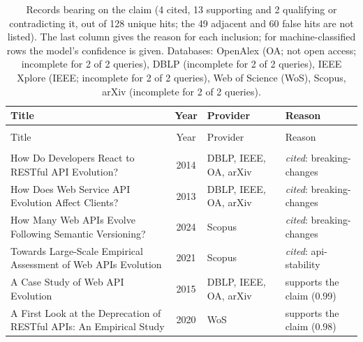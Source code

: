
\begingroup\footnotesize
\begin{longtable}{@{}%
  >{\raggedright\arraybackslash}p{}c%
  >{\raggedright\arraybackslash}p{}%
  >{\raggedright\arraybackslash}p{}@{}}
\caption{Records bearing on the claim (4 cited, 13 supporting and 2 qualifying or contradicting it, out of 128 unique hits; the 49 adjacent and 60 false hits are not listed). The last column gives the reason for each inclusion; for machine-classified rows the model's confidence is given. Databases: OpenAlex (OA; not open access; incomplete for 2 of 2 queries), DBLP (incomplete for 2 of 2 queries), IEEE Xplore (IEEE; incomplete for 2 of 2 queries), Web of Science (WoS), Scopus, arXiv (incomplete for 2 of 2 queries).}\label{tab:t-api-evolution}\\
\toprule
Title & Year & Provider & Reason \\
\midrule
\endfirsthead
\multicolumn{4}{@{}l}{\emph{\tablename~\thetable{} (cont.)}}\\
\toprule
Title & Year & Provider & Reason \\
\midrule
\endhead
\midrule \multicolumn{4}{r@{}}{\emph{continued on next page}}\\
\endfoot
\bottomrule
\endlastfoot
How Do Developers React to RESTful API Evolution? & 2014 & DBLP, IEEE, OA, arXiv & \emph{cited}: breaking-changes \\
How Does Web Service API Evolution Affect Clients? & 2013 & DBLP, IEEE, OA, arXiv & \emph{cited}: breaking-changes \\
How Many Web APIs Evolve Following Semantic Versioning? & 2024 & Scopus & \emph{cited}: breaking-changes \\
Towards Large-Scale Empirical Assessment of Web APIs Evolution & 2021 & Scopus & \emph{cited}: api-stability \\
A Case Study of Web API Evolution & 2015 & DBLP, IEEE, OA, arXiv & supports the claim (0.99) \\
A First Look at the Deprecation of RESTful APIs: An Empirical Study & 2020 & WoS & supports the claim (0.98) \\

\end{longtable}
